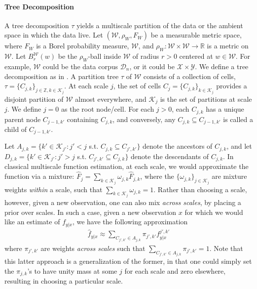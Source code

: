 \documentclass{article} %
\newcommand{\Real}{\mathbb{R}}
\providecommand{\mh}[1]{\hat{#1}}
\providecommand{\mc}[1]{\mathcal{#1}}
\newcommand{\from}{{\ensuremath{\colon}}}  %
\newcommand{\ZZ}{\mathbb{Z}}
\begin{document}
\paragraph{Tree Decomposition}
A tree decomposition $\tau$ yields a multiscale partition of the data or the ambient space in which the data live.
Let $(\mc{W},\rho_W, F_W)$ be a measurable metric space, where $F_W$ is a Borel probability measure, $\mc{W}$, and $\rho_W \from \mc{W} \times \mc{W} \to \Real$ is a metric on $\mc{W}$.  Let $B_r^{\mc{W}}(w)$ be the $\rho_W$-ball inside $\mc{W}$ of radius $r > 0$ centered at $w \in \mc{W}$. For example, $\mc{W}$ could be the data corpus $\mc{D}_n$, or it could be $\mc{X} \times \mc{Y}$. We define a tree decomposition as in \cite{Allard2012,ChenMaggioni12}.  A partition tree $\tau$ of $\mc{W}$ consists of a collection of cells, $\tau=\{C_{j,k}\}_{j \in \ZZ, k \in \mc{K}_j}$.  At each scale $j$, the set of cells $C_j=\{C_{j,k}\}_{k \in \mc{K}_j}$ provides a disjoint partition of $\mc{W}$ almost everywhere, and $\mc{K}_j$ is the set of partitions at scale $j$.  We define $j=0$ as the root node/cell.  For each $j > 0$,  each $C_{j,k}$ has a unique parent node $C_{j-1,k'}$ containing $C_{j,k}$, and conversely, any $C_{j,k} \subseteq C_{j-1,k'}$ is called a child of $C_{j-1,k'}$.


Let $A_{j,k}=\{k' \in \mc{K}_{j'} : j' < j$ s.t. $C_{j,k} \subseteq C_{j',k'}\}$ denote the ancestors of $C_{j,k}$, and let $D_{j,k}=\{k' \in \mc{K}_{j'} : j' > j$ s.t. $C_{j',k'} \subseteq C_{j,k}\}$ denote the descendants of $C_{j,k}$.
In classical multiscale function estimation, at each scale, we would approximate the function via a mixture: $\mh{F}_j = \sum_{k \in \mc{K}_j} \omega_{j,k} \mh{F}_{j,k}$, where the $\{\omega_{j,k}\}_{j \in \mc{K}_j}$ are mixture weights \emph{within} a scale, such that $\sum_{k \in \mc{K}_j} \omega_{j,k}=1$.  Rather than choosing a scale, however, given a new observation, one can also mix \emph{across scales},  by placing a prior over scales.  In such a case, given a new observation $x$ for which we would like an estimate of $f_{y|x}$, we have the following approximation 
\begin{align}
\mh{f}_{y|x} \approx \sum_{C_{j',k'} \in A_{j,k}} \pi_{j',k'} f^{j',k'}_{y|x}	\label{eq:base}
\end{align}
where $\pi_{j',k'}$ are weights \emph{across scales} such that $\sum_{C_{j',k'} \in A_{j,k}} \pi_{j',k'}=1$.  Note that this latter approach is a generalization of the former, in that one could simply set the $\pi_{j,k}$'s to have unity mass at some $j$ for each scale and zero elsewhere, resulting in choosing a particular scale.
\end{document}
